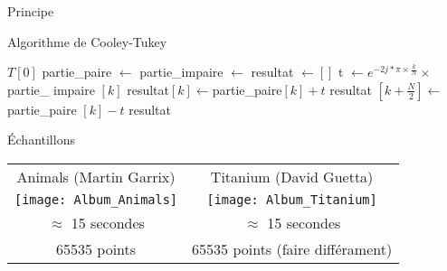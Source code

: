\documentclass[10pt]{beamer}
\begin{document}
\begin{frame}[t]{Principe}


%
\begin{algorithm}[H]

\caption{Algorithme de Cooley-Tukey}\label{ACT}
\begin{algorithmic}[1]
	\State \Return $T[0]$
\EndIf
\State partie\_paire $\gets$ 
\State partie\_impaire $\gets$ 
\State resultat $\gets []$
\State t $\gets e^{-2j*\pi\times\frac{k}{N}}\times$ partie\_ impaire $[k]$
\State resultat$[k]\gets$partie\_paire$[k] + t$
\State resultat $[k + \frac{N}{2}] \gets$ partie\_paire $ [k] - t$
\EndFor
\State \Return resultat
\EndFunction
\end{algorithmic}
\end{algorithm}
\end{frame}
\center
\begin{frame}[t]{Échantillons}
	\begin{tabular}{c c}
		Animals (Martin Garrix) & Titanium (David Guetta)\\
		\texttt{[image: Album\_Animals]} & \texttt{[image: Album\_Titanium]}\\
		$\approx$ 15 secondes & $\approx$ 15 secondes\\
		65535 points & 65535 points (faire différament)
	\end{tabular}
\end{frame}
\end{document}
